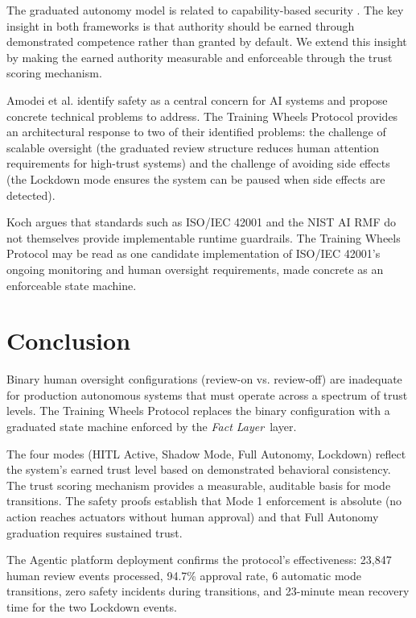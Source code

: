 \documentclass[12pt]{article}
\newcommand{\fact}{\textit{Fact Layer}}
\begin{document}
The graduated autonomy model is related to capability-based security \cite{brentano2011}. The key insight in both frameworks is that authority should be earned through demonstrated competence rather than granted by default. We extend this insight by making the earned authority measurable and enforceable through the trust scoring mechanism.

Amodei et al. \cite{amodei2016} identify safety as a central concern for AI systems and propose concrete technical problems to address. The Training Wheels Protocol provides an architectural response to two of their identified problems: the challenge of scalable oversight (the graduated review structure reduces human attention requirements for high-trust systems) and the challenge of avoiding side effects (the Lockdown mode ensures the system can be paused when side effects are detected).

Koch \cite{koch2026} argues that standards such as ISO/IEC 42001 \cite{iso2023} and the NIST AI RMF \cite{nist2023} do not themselves provide implementable runtime guardrails. The Training Wheels Protocol may be read as one candidate implementation of ISO/IEC 42001's ongoing monitoring and human oversight requirements, made concrete as an enforceable state machine.

\section{Conclusion}
\label{sec:conclusion}

Binary human oversight configurations (review-on vs. review-off) are inadequate for production autonomous systems that must operate across a spectrum of trust levels. The Training Wheels Protocol replaces the binary configuration with a graduated state machine enforced by the \fact\ layer.

The four modes (HITL Active, Shadow Mode, Full Autonomy, Lockdown) reflect the system's earned trust level based on demonstrated behavioral consistency. The trust scoring mechanism provides a measurable, auditable basis for mode transitions. The safety proofs establish that Mode 1 enforcement is absolute (no action reaches actuators without human approval) and that Full Autonomy graduation requires sustained trust.

The Agentic platform deployment confirms the protocol's effectiveness: 23,847 human review events processed, 94.7\% approval rate, 6 automatic mode transitions, zero safety incidents during transitions, and 23-minute mean recovery time for the two Lockdown events.
\end{document}
